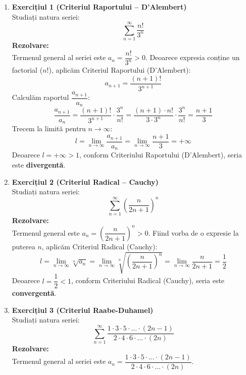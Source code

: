 \documentclass[12pt, a4paper]{report}
\begin{document}
	\begin{enumerate}[label=\textbf{\roman*)}]
		
		\item \textbf{Exercițiul 1 (Criteriul Raportului -- D'Alembert)} \\
		Studiați natura seriei:
		\[
		\sum_{n=1}^{\infty} \frac{n!}{3^n}
		\]
		\textbf{Rezolvare:} \\
		Termenul general al seriei este $a_n = \dfrac{n!}{3^n} > 0$. Deoarece expresia conține un factorial ($n!$), aplicăm Criteriul Raportului (D'Alembert):
		\[
		a_{n+1} = \frac{(n+1)!}{3^{n+1}}
		\]
		Calculăm raportul $\dfrac{a_{n+1}}{a_n}$:
		\[
		\frac{a_{n+1}}{a_n} = \frac{(n+1)!}{3^{n+1}} \cdot \frac{3^n}{n!} = \frac{(n+1) \cdot n!}{3 \cdot 3^n} \cdot \frac{3^n}{n!} = \frac{n+1}{3}
		\]
		Trecem la limită pentru $n \to \infty$:
		\[
		l = \lim_{n \to \infty} \frac{a_{n+1}}{a_n} = \lim_{n \to \infty} \frac{n+1}{3} = +\infty
		\]
		Deoarece $l = +\infty > 1$, conform Criteriului Raportului (D'Alembert), seria este \textbf{divergentă}.
		
		\vspace{0.5cm}
		
		\item \textbf{Exercițiul 2 (Criteriul Radical -- Cauchy)} \\
		Studiați natura seriei:
		\[
		\sum_{n=1}^{\infty} \left(\frac{n}{2n+1}\right)^n
		\]
		\textbf{Rezolvare:} \\
		Termenul general este $a_n = \left(\dfrac{n}{2n+1}\right)^n > 0$. Fiind vorba de o expresie la puterea $n$, aplicăm Criteriul Radical (Cauchy):
		\[
		l = \lim_{n \to \infty} \sqrt[n]{a_n} = \lim_{n \to \infty} \sqrt[n]{\left(\frac{n}{2n+1}\right)^n} = \lim_{n \to \infty} \frac{n}{2n+1} = \frac{1}{2}
		\]
		Deoarece $l = \dfrac{1}{2} < 1$, conform Criteriului Radical (Cauchy), seria este \textbf{convergentă}.
		
		\vspace{0.5cm}
		
		\item \textbf{Exercițiul 3 (Criteriul Raabe-Duhamel)} \\
		Studiați natura seriei:
		\[
		\sum_{n=1}^{\infty} \frac{1 \cdot 3 \cdot 5 \cdot \ldots \cdot (2n-1)}{2 \cdot 4 \cdot 6 \cdot \ldots \cdot (2n)}
		\]
		\textbf{Rezolvare:} \\
		Termenul general al seriei este $a_n = \dfrac{1 \cdot 3 \cdot 5 \cdot \ldots \cdot (2n-1)}{2 \cdot 4 \cdot 6 \cdot \ldots \cdot (2n)}$.
		

\end{enumerate}
\end{document}
